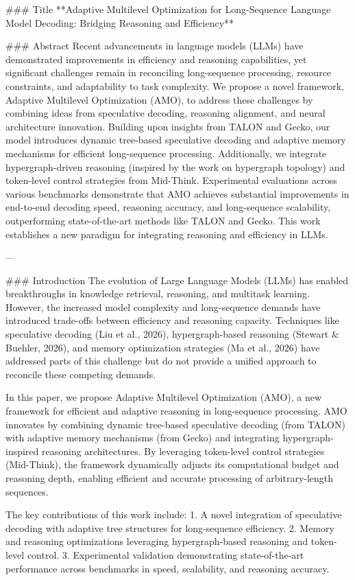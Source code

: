 ### Title  
**Adaptive Multilevel Optimization for Long-Sequence Language Model Decoding: Bridging Reasoning and Efficiency**

### Abstract  
Recent advancements in language models (LLMs) have demonstrated improvements in efficiency and reasoning capabilities, yet significant challenges remain in reconciling long-sequence processing, resource constraints, and adaptability to task complexity. We propose a novel framework, Adaptive Multilevel Optimization (AMO), to address these challenges by combining ideas from speculative decoding, reasoning alignment, and neural architecture innovation. Building upon insights from TALON and Gecko, our model introduces dynamic tree-based speculative decoding and adaptive memory mechanisms for efficient long-sequence processing. Additionally, we integrate hypergraph-driven reasoning (inspired by the work on hypergraph topology) and token-level control strategies from Mid-Think. Experimental evaluations across various benchmarks demonstrate that AMO achieves substantial improvements in end-to-end decoding speed, reasoning accuracy, and long-sequence scalability, outperforming state-of-the-art methods like TALON and Gecko. This work establishes a new paradigm for integrating reasoning and efficiency in LLMs.

---

### Introduction  
The evolution of Large Language Models (LLMs) has enabled breakthroughs in knowledge retrieval, reasoning, and multitask learning. However, the increased model complexity and long-sequence demands have introduced trade-offs between efficiency and reasoning capacity. Techniques like speculative decoding (Liu et al., 2026), hypergraph-based reasoning (Stewart & Buehler, 2026), and memory optimization strategies (Ma et al., 2026) have addressed parts of this challenge but do not provide a unified approach to reconcile these competing demands.  

In this paper, we propose Adaptive Multilevel Optimization (AMO), a new framework for efficient and adaptive reasoning in long-sequence processing. AMO innovates by combining dynamic tree-based speculative decoding (from TALON) with adaptive memory mechanisms (from Gecko) and integrating hypergraph-inspired reasoning architectures. By leveraging token-level control strategies (Mid-Think), the framework dynamically adjusts its computational budget and reasoning depth, enabling efficient and accurate processing of arbitrary-length sequences.

The key contributions of this work include:
1. A novel integration of speculative decoding with adaptive tree structures for long-sequence efficiency.
2. Memory and reasoning optimizations leveraging hypergraph-based reasoning and token-level control.
3. Experimental validation demonstrating state-of-the-art performance across benchmarks in speed, scalability, and reasoning accuracy.

